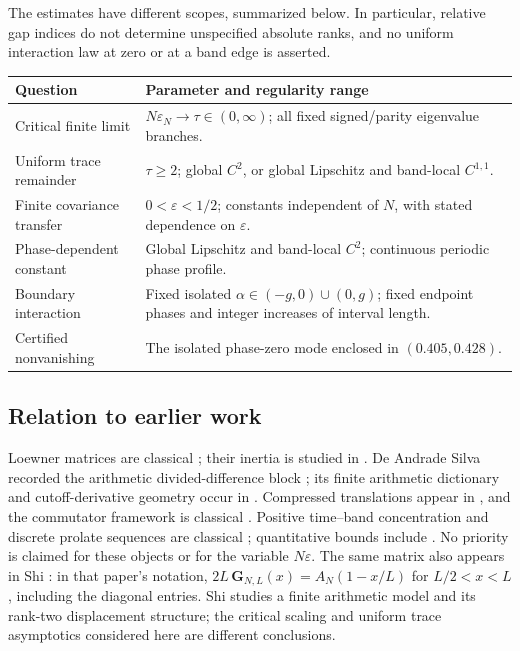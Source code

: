 The estimates have different scopes, summarized below. In particular,
relative gap indices do not determine unspecified absolute ranks, and
no uniform interaction law at zero or at a band edge is asserted.
\begin{center}
\begin{tabular}{@{}p{}p{}@{}}
\hline
Question & Parameter and regularity range\\\hline
Critical finite limit & $N\varepsilon_N\to\tau\in(0,\infty)$;
all fixed signed/parity eigenvalue branches.\\
Uniform trace remainder & $\tau\ge2$; global $C^2$, or global Lipschitz
and band-local $C^{1,1}$.\\
Finite covariance transfer & $0<\varepsilon<1/2$; constants independent
of $N$, with stated dependence on $\varepsilon$.\\
Phase-dependent constant & Global Lipschitz and band-local $C^2$;
continuous periodic phase profile.\\
Boundary interaction & Fixed isolated $\alpha\in(-g,0)\cup(0,g)$;
fixed endpoint phases and integer increases of interval length.\\
Certified nonvanishing & The isolated phase-zero mode enclosed in
$(0.405,0.428)$.\\\hline
\end{tabular}
\end{center}

\subsection*{Relation to earlier work}
Loewner matrices are classical \cite{Loewner1934}; their inertia is
studied in \cite{BhatiaFriedlandJain2016}.  De Andrade Silva recorded the arithmetic
divided-difference block \cite{SilvaPrime,SilvaFramework}; its finite
arithmetic dictionary and cutoff-derivative geometry occur in
\cite{GroskinDictionary,GroskinPrimeEvent}.  Compressed translations
appear in \cite[Section~5.1]{GuoPoleFree}, and the commutator framework
is classical \cite{Calderon1965}.
Positive time--band concentration and discrete prolate sequences are
classical \cite{Fuchs1964,LandauPollak1962,LandauWidom1980,Slepian1965,Slepian1978,SlepianPollak1961};
quantitative bounds include \cite{BonamiJamingKaroui2021,Karnik2021}.
No priority is claimed for these objects or for the variable $N\varepsilon$.
The same matrix also appears in Shi
\cite[eqs.~(3.4)--(3.7)]{Shi2026}: in that paper's notation,
$2L\,\mathbf G_{N,L}(x)=A_N(1-x/L)$ for $L/2<x<L$, including the
diagonal entries.  Shi studies a finite arithmetic model and its
rank-two displacement structure; the critical scaling and uniform
trace asymptotics considered here are different conclusions.

